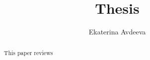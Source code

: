 \documentclass{article}
\begin{document}
 
\pagenumbering{}
\title{\textbf{Thesis}}

\author{Ekaterina Avdeeva}

\maketitle

\begin{abstract}
This paper reviews
\end{abstract}




\pagestyle{fancy}
\fancyhf{}
\lhead[]{\thepage}
\rhead[\thepage]{}

\tableofcontents

%









%
%
%

%
%

%
%
%

%
%
%
%
%
%
%


\end{document}
